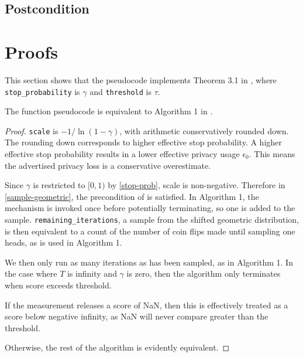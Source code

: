 \documentclass{article}
\begin{document}
\subsection*{Postcondition}

\section{Proofs}
This section shows that the pseudocode implements Theorem 3.1 in \cite{liu2018privateselectionprivatecandidates}, where
\texttt{stop\_probability} is $\gamma$ and
\texttt{threshold} is $\tau$.

\begin{theorem}
    \label{algorithm-equivalence}
    The function pseudocode is equivalent to Algorithm 1 in \cite{liu2018privateselectionprivatecandidates}.
\end{theorem}

\begin{proof}
    \texttt{scale} is $-1 / \ln(1 - \gamma)$, with arithmetic conservatively rounded down.
    The rounding down corresponds to higher effective stop probability.
    A higher effective stop probability results in a lower effective privacy usage $\epsilon_0$.
    This means the advertised privacy loss is a conservative overestimate.

    Since $\gamma$ is restricted to $[0, 1)$ by \ref{stop-prob}, scale is non-negative.
    Therefore in \ref{sample-geometric},
    the precondition of  is satisfied.
    In Algorithm 1, the mechanism is invoked once before potentially terminating, so one is added to the sample.
    \texttt{remaining\_iterations}, a sample from the shifted geometric distribution,
    is then equivalent to a count of the number of coin flips made until sampling one heads,
    as is used in Algorithm 1.

    We then only run as many iterations as has been sampled, as in Algorithm 1.
    In the case where $T$ is infinity and $\gamma$ is zero, then the algorithm only terminates when score exceeds threshold.

    If the measurement releases a score of NaN, then this is effectively treated as a score below negative infinity,
    as NaN will never compare greater than the threshold.

    Otherwise, the rest of the algorithm is evidently equivalent.
\end{proof}
\end{document}
